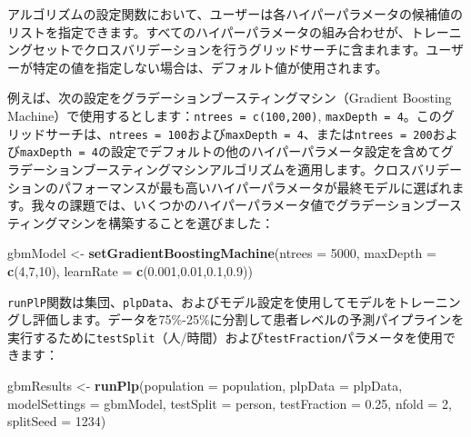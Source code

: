 \documentclass[
  11pt]{book}
\newenvironment{Shaded}{\begin{snugshade}}{\end{snugshade}}
\newcommand{\AttributeTok}[1]{\textcolor[rgb]{0.13,0.29,0.53}{#1}}
\newcommand{\DecValTok}[1]{\textcolor[rgb]{0.00,0.00,0.81}{#1}}
\newcommand{\FloatTok}[1]{\textcolor[rgb]{0.00,0.00,0.81}{#1}}
\newcommand{\FunctionTok}[1]{\textcolor[rgb]{0.13,0.29,0.53}{\textbf{#1}}}
\newcommand{\NormalTok}[1]{#1}
\newcommand{\OtherTok}[1]{\textcolor[rgb]{0.56,0.35,0.01}{#1}}
\newcommand{\StringTok}[1]{\textcolor[rgb]{0.31,0.60,0.02}{#1}}
\theoremstyle{definition}
\theoremstyle{definition}
\theoremstyle{definition}
\theoremstyle{definition}
\theoremstyle{remark}
\begin{document}
アルゴリズムの設定関数において、ユーザーは各ハイパーパラメータの候補値のリストを指定できます。すべてのハイパーパラメータの組み合わせが、トレーニングセットでクロスバリデーションを行うグリッドサーチに含まれます。ユーザーが特定の値を指定しない場合は、デフォルト値が使用されます。

例えば、次の設定をグラデーションブースティングマシン（Gradient Boosting Machine）で使用するとします：\texttt{ntrees\ =\ c(100,200)}, \texttt{maxDepth\ =\ 4}。このグリッドサーチは、\texttt{ntrees\ =\ 100}および\texttt{maxDepth\ =\ 4}、または\texttt{ntrees\ =\ 200}および\texttt{maxDepth\ =\ 4}の設定でデフォルトの他のハイパーパラメータ設定を含めてグラデーションブースティングマシンアルゴリズムを適用します。クロスバリデーションのパフォーマンスが最も高いハイパーパラメータが最終モデルに選ばれます。我々の課題では、いくつかのハイパーパラメータ値でグラデーションブースティングマシンを構築することを選びました：

\begin{Shaded}
\begin{Highlighting}[]
\NormalTok{gbmModel }\OtherTok{\textless{}{-}} \FunctionTok{setGradientBoostingMachine}\NormalTok{(}\AttributeTok{ntrees =} \DecValTok{5000}\NormalTok{,}
                                       \AttributeTok{maxDepth =} \FunctionTok{c}\NormalTok{(}\DecValTok{4}\NormalTok{,}\DecValTok{7}\NormalTok{,}\DecValTok{10}\NormalTok{),}
                                       \AttributeTok{learnRate =} \FunctionTok{c}\NormalTok{(}\FloatTok{0.001}\NormalTok{,}\FloatTok{0.01}\NormalTok{,}\FloatTok{0.1}\NormalTok{,}\FloatTok{0.9}\NormalTok{))}
\end{Highlighting}
\end{Shaded}

\texttt{runPlP}関数は集団、\texttt{plpData}、およびモデル設定を使用してモデルをトレーニングし評価します。データを75\%-25\%に分割して患者レベルの予測パイプラインを実行するために\texttt{testSplit}（人/時間）および\texttt{testFraction}パラメータを使用できます：

\begin{Shaded}
\begin{Highlighting}[]
\NormalTok{gbmResults }\OtherTok{\textless{}{-}} \FunctionTok{runPlp}\NormalTok{(}\AttributeTok{population =}\NormalTok{ population,}
                     \AttributeTok{plpData =}\NormalTok{ plpData,}
                     \AttributeTok{modelSettings =}\NormalTok{ gbmModel,}
                     \AttributeTok{testSplit =} \StringTok{\textquotesingle{}person\textquotesingle{}}\NormalTok{,}
                     \AttributeTok{testFraction =} \FloatTok{0.25}\NormalTok{,}
                     \AttributeTok{nfold =} \DecValTok{2}\NormalTok{,}
                     \AttributeTok{splitSeed =} \DecValTok{1234}\NormalTok{)}
\end{Highlighting}
\end{Shaded}
\end{document}
